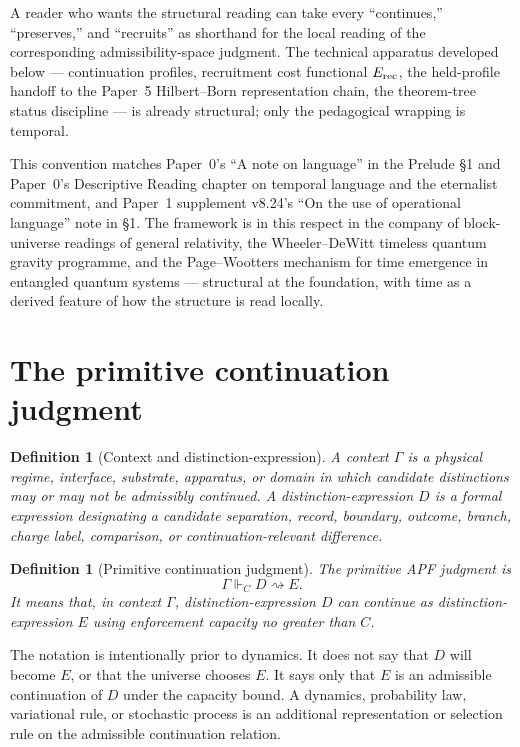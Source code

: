 \documentclass[11pt]{article}
\newtheorem{definition}[theorem]{Definition}
\theoremstyle{remark}
\newcommand{\G}{\Gamma}
\newcommand{\entails}{\Vdash}
\newcommand{\goes}{\rightsquigarrow}
\newcommand{\Erec}{E_{\rm rec}}
\begin{document}
A reader who wants the structural reading can take every ``continues,'' ``preserves,'' and ``recruits'' as shorthand for the local reading of the corresponding admissibility-space judgment.  The technical apparatus developed below --- continuation profiles, recruitment cost functional $\Erec$, the held-profile handoff to the Paper~5 Hilbert--Born representation chain, the theorem-tree status discipline --- is already structural; only the pedagogical wrapping is temporal.

This convention matches Paper~0's ``A note on language'' in the Prelude \S1 and Paper~0's Descriptive Reading chapter on temporal language and the eternalist commitment, and Paper~1 supplement v8.24's ``On the use of operational language'' note in \S1.  The framework is in this respect in the company of block-universe readings of general relativity, the Wheeler--DeWitt timeless quantum gravity programme, and the Page--Wootters mechanism for time emergence in entangled quantum systems --- structural at the foundation, with time as a derived feature of how the structure is read locally.

\section{The primitive continuation judgment}

\begin{definition}[Context and distinction-expression]
A \emph{context} \(\G\) is a physical regime, interface, substrate, apparatus, or domain in which candidate distinctions may or may not be admissibly continued.  A \emph{distinction-expression} \(D\) is a formal expression designating a candidate separation, record, boundary, outcome, branch, charge label, comparison, or continuation-relevant difference.
\end{definition}

\begin{definition}[Primitive continuation judgment]
The primitive APF judgment is
\[
        \G\entails_C D\goes E.
\]
It means that, in context \(\G\), distinction-expression \(D\) can continue as distinction-expression \(E\) using enforcement capacity no greater than \(C\).
\end{definition}

The notation is intentionally prior to dynamics.  It does not say that \(D\) will become \(E\), or that the universe chooses \(E\).  It says only that \(E\) is an admissible continuation of \(D\) under the capacity bound.  A dynamics, probability law, variational rule, or stochastic process is an additional representation or selection rule on the admissible continuation relation.
\end{document}
